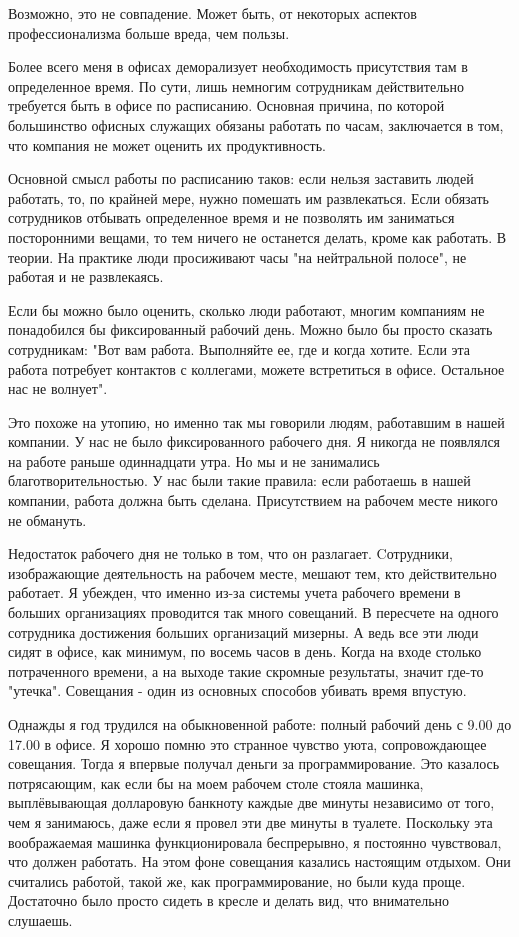 \documentclass[ebook,12pt,oneside,openany]{memoir}
\begin{document}
Возможно, это не совпадение. Может быть, от некоторых аспектов
профессионализма больше вреда, чем пользы.

Более всего меня в офисах деморализует необходимость присутствия там в
определенное время. По сути, лишь немногим сотрудникам действительно
требуется быть в офисе по расписанию. Основная причина, по которой
большинство офисных служащих обязаны работать по часам, заключается в
том, что компания не может оценить их продуктивность.

Основной смысл работы по расписанию таков: если нельзя заставить людей
работать, то, по крайней мере, нужно помешать им развлекаться. Если
обязать сотрудников отбывать определенное время и не позволять им
заниматься посторонними вещами, то тем ничего не останется делать,
кроме как работать. В теории. На практике люди просиживают часы "на
нейтральной полосе", не работая и не развлекаясь.

Если бы можно было оценить, сколько люди работают, многим компаниям не
понадобился бы фиксированный рабочий день. Можно было бы просто
сказать сотрудникам: "Вот вам работа. Выполняйте ее, где и когда
хотите. Если эта работа потребует контактов с коллегами, можете
встретиться в офисе. Остальное нас не волнует".

Это похоже на утопию, но именно так мы говорили людям, работавшим в
нашей компании. У нас не было фиксированного рабочего дня. Я никогда
не появлялся на работе раньше одиннадцати утра. Но мы и не занимались
благотворительностью. У нас были такие правила: если работаешь в нашей
компании, работа должна быть сделана. Присутствием на рабочем месте
никого не обмануть.

Недостаток рабочего дня не только в том, что он разлагает. Cотрудники,
изображающие деятельность на рабочем месте, мешают тем, кто
действительно работает. Я убежден, что именно из-за системы учета
рабочего времени в больших организациях проводится так много
совещаний. В пересчете на одного сотрудника достижения больших
организаций мизерны. А ведь все эти люди сидят в офисе, как минимум,
по восемь часов в день. Когда на входе столько потраченного времени, а
на выходе такие скромные результаты, значит где-то "утечка". Совещания
- один из основных способов убивать время впустую.

Однажды я год трудился на обыкновенной работе: полный рабочий день с
9.00 до 17.00 в офисе. Я хорошо помню это странное чувство уюта,
сопровождающее совещания. Тогда я впервые получал деньги за
программирование. Это казалось потрясающим, как если бы на моем
рабочем столе стояла машинка, выплёвывающая долларовую банкноту каждые
две минуты независимо от того, чем я занимаюсь, даже если я провел эти
две минуты в туалете. Поскольку эта воображаемая машинка
функционировала беспрерывно, я постоянно чувствовал, что должен
работать. На этом фоне совещания казались настоящим отдыхом. Они
считались работой, такой же, как программирование, но были куда проще.
Достаточно было просто сидеть в кресле и делать вид, что внимательно
слушаешь.
\end{document}
